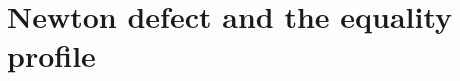 \documentclass[reqno, 11pt]{amsart} %
\numberwithin{equation}{section}
\theoremstyle{definition}
\begin{document}



\section{Newton defect and the equality profile}\label{sec:newton}
\end{document}
